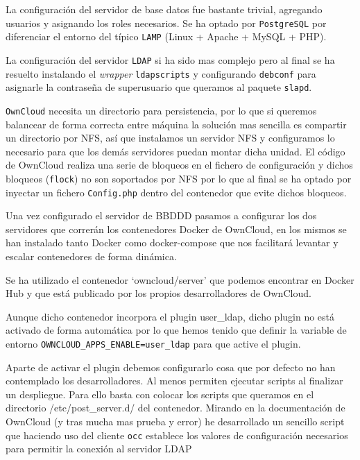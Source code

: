 \bigskip
La configuración del servidor de base datos fue bastante trivial, agregando usuarios y asignando los roles necesarios. Se ha optado por \texttt{PostgreSQL} por diferenciar el entorno del típico \texttt{LAMP} (Linux + Apache + MySQL + PHP).

\bigskip
La configuración del servidor \texttt{LDAP} si ha sido mas complejo pero al final se ha resuelto instalando el \textit{wrapper} \texttt{ldapscripts} y configurando \texttt{debconf} para asignarle la contraseña de superusuario que queramos al paquete \texttt{slapd}. 

\bigskip
\texttt{OwnCloud} necesita un directorio para persistencia, por lo que si queremos balancear de forma correcta entre máquina la solución mas sencilla es compartir un directorio por NFS, así que instalamos un servidor NFS y configuramos lo necesario para que los demás servidores puedan montar dicha unidad. El código de OwnCloud realiza una serie de bloqueos en el fichero de configuración y dichos bloqueos (\texttt{flock}) no son soportados por NFS por lo que al final se ha optado por inyectar un fichero \texttt{Config.php} dentro del contenedor que evite dichos bloqueos.


\bigskip
Una vez configurado el servidor de BBDDD pasamos a configurar los dos servidores que correrán los contenedores Docker de OwnCloud, en los mismos se han instalado tanto Docker como docker-compose que nos facilitará levantar y escalar contenedores de forma dinámica.

\bigskip
Se ha utilizado el contenedor `owncloud/server' que podemos encontrar en Docker Hub y que está publicado por los propios desarrolladores de OwnCloud.

\bigskip
Aunque dicho contenedor incorpora el plugin user\_ldap, dicho plugin no está activado de forma automática por lo que hemos tenido que definir la variable de entorno \texttt{OWNCLOUD\_APPS\_ENABLE=user\_ldap} para que active el plugin.

\bigskip
Aparte de activar el plugin debemos configurarlo cosa que por defecto no han contemplado los desarrolladores. Al menos permiten ejecutar scripts al finalizar un despliegue. Para ello basta con colocar los scripts que queramos en el directorio /etc/post\_server.d/ del contenedor. Mirando en la documentación de OwnCloud (y tras mucha mas prueba y error) he desarrollado un sencillo script que haciendo uso del cliente \texttt{occ} establece los valores de configuración necesarios para permitir la conexión al servidor LDAP

